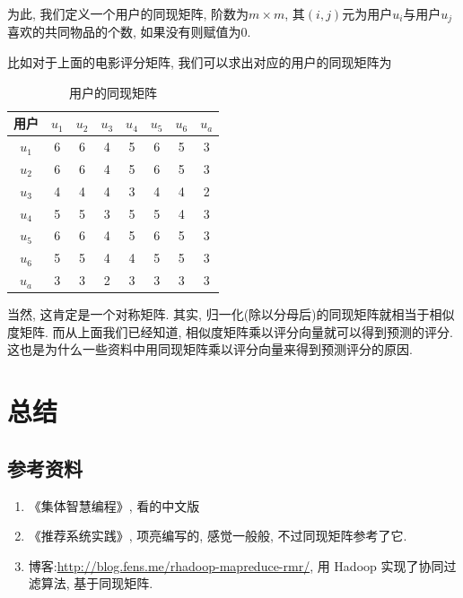\documentclass[a4paper,UTF8]{ctexart}
\theoremstyle{plain} \newtheorem{theorem}{定理}[section]
\theoremstyle{plain} \newtheorem{definition}{定义}[section]
\theoremstyle{plain} \newtheorem{lemma}{引理}[section]
\theoremstyle{plain} \newtheorem{proposition}{命题}[section]
\theoremstyle{plain} \newtheorem{example}{例}[section]
\theoremstyle{plain} \newtheorem{remark}{注}[section]
\theoremstyle{plain} \newtheorem{corollary}{推论}[section]
\begin{document}
为此, 我们定义一个用户的同现矩阵, 阶数为$m \times m$, 其$(i,j)$元为用户$u_{i}$与用户$u_{j}$喜欢的共同物品的个数, 如果没有则赋值为$0$.

比如对于上面的电影评分矩阵, 我们可以求出对应的用户的同现矩阵为
\begin{table}[!htb]
\centering
\caption{用户的同现矩阵}
\label{usermatrix}
\begin{tabular}{c|c|c|c|c|c|c|c}
	\hline
	用户 & $u_1$ & $u_2$ & $u_3$ & $u_4$ & $u_5$ & $u_6$ & $u_a$ \\
	\hline
	$u_1$ & 6 & 6 & 4 & 5 & 6 & 5 & 3 \\ 
	\hline
	$u_2$ & 6 & 6 & 4 & 5 & 6 & 5 & 3 \\ 
	\hline
	$u_3$ & 4 & 4 & 4 & 3 & 4 & 4 & 2 \\ 
	\hline
	$u_4$ & 5 & 5 & 3 & 5 & 5 & 4 & 3 \\ 
	\hline
	$u_5$ & 6 & 6 & 4 & 5 & 6 & 5 & 3 \\ 
	\hline
	$u_6$ & 5 & 5 & 4 & 4 & 5 & 5 & 3 \\ 
	\hline
	$u_a$ & 3 & 3 & 2 & 3 & 3 & 3 & 3 \\ 
	\hline
\end{tabular}
\end{table}

当然, 这肯定是一个对称矩阵. 其实, 归一化(除以分母后)的同现矩阵就相当于相似度矩阵. 而从上面我们已经知道, 相似度矩阵乘以评分向量就可以得到预测的评分. 这也是为什么一些资料中用同现矩阵乘以评分向量来得到预测评分的原因.



\section{总结}
\subsection{参考资料}
\begin{enumerate}[(1)]
\item 《集体智慧编程》, 看的中文版

\item 《推荐系统实践》, 项亮编写的, 感觉一般般, 不过同现矩阵参考了它.

\item 博客:\url{http://blog.fens.me/rhadoop-mapreduce-rmr/}, 用 Hadoop 实现了协同过滤算法, 基于同现矩阵.


\end{enumerate}
\end{document}
